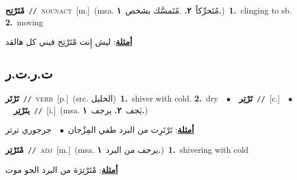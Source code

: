 \documentclass[10pt,a4paper,twoside]{article} %
\begin{document}
\begin{multicols}{2}
{\setlength\topsep{0pt}\textbf{\foreignlanguage{arabic}{مْتَرْتِح}}\ {\color{gray}\texttt{//}\color{black}}\ \textsc{noun\textunderscore act}\ [m.]\ \color{gray}(msa. \foreignlanguage{arabic}{مُتَحرِّكاً}~\foreignlanguage{arabic}{\textbf{٢.}}  .\foreignlanguage{arabic}{مُتَمسَّك بشخص}~\foreignlanguage{arabic}{\textbf{١.}})\color{black}\ \textbf{1.}~clinging to sb.  \textbf{2.}~moving\  \begin{flushright}\color{gray}\foreignlanguage{arabic}{\textbf{\underline{\foreignlanguage{arabic}{أمثلة}}}: ليش إِنت مْتَرْتِح فيني كل هالقد}\end{flushright}\color{black}} \vspace{2mm}

\vspace{-3mm}
\subsection*{\color{blue}\foreignlanguage{arabic}{ت.ر.ت.ر}\color{blue}{}} 

{\setlength\topsep{0pt}\textbf{\foreignlanguage{arabic}{تَرْتَر}}\ {\color{gray}\texttt{//}\color{black}}\ \textsc{verb}\ [p.]\ (src. \color{gray}\foreignlanguage{arabic}{الخليل}\color{black})\ \textbf{1.}~shiver with cold.  \textbf{2.}~dry\ \ $\bullet$\ \ \setlength\topsep{0pt}\textbf{\foreignlanguage{arabic}{تَرْتِر}}\ {\color{gray}\texttt{//}\color{black}}\ [c.]\ \ $\bullet$\ \ \setlength\topsep{0pt}\textbf{\foreignlanguage{arabic}{يتَرْتِر}}\ {\color{gray}\texttt{//}\color{black}}\ [i.]\ \color{gray}(msa. \foreignlanguage{arabic}{يَجف}~\foreignlanguage{arabic}{\textbf{٢.}}  \foreignlanguage{arabic}{يرجف}~\foreignlanguage{arabic}{\textbf{١.}})\color{black}\  \begin{flushright}\color{gray}\foreignlanguage{arabic}{\textbf{\underline{\foreignlanguage{arabic}{أمثلة}}}: تَرْتَرِت من البرد طفي المِزْجان\ $\bullet$\ \  جرجوري ترتر }\end{flushright}\color{black}} \vspace{2mm}

{\setlength\topsep{0pt}\textbf{\foreignlanguage{arabic}{مْتَرْتِر}}\ {\color{gray}\texttt{//}\color{black}}\ \textsc{adj}\ [m.]\ \color{gray}(msa. \foreignlanguage{arabic}{يرجف من البرد}~\foreignlanguage{arabic}{\textbf{١.}})\color{black}\ \textbf{1.}~shivering with cold\  \begin{flushright}\color{gray}\foreignlanguage{arabic}{\textbf{\underline{\foreignlanguage{arabic}{أمثلة}}}: مْتَرْتِرَة من البرد الجو موت}\end{flushright}\color{black}} \vspace{2mm}


\end{multicols}
\end{document}
